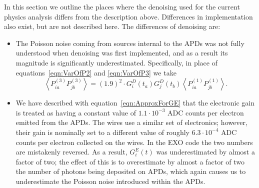 In this section we outline the places where the denoising used for the current physics analysis differs from the description above.  Differences in implementation also exist, but are not described here.  The differences of denoising are:
\begin{itemize}
\item The Poisson noise coming from sources internal to the APDs was not fully understood when denoising was first implemented, and as a result its magnitude is significantly underestimated.  Specifically, in place of equations~\ref{eqn:VarOfP2} and \ref{eqn:VarOfP3} we take
\begin{equation}
\left< P^{(3)}_{ia} P^{(3)}_{jb} \right> = (1.9)^2 \cdot G^D_i(t_a)G^D_j(t_b) \left< P^{(1)}_{ia} P^{(1)}_{jb} \right>.
\end{equation}
\item We have described with equation~\ref{eqn:ApproxForGE} that the electronic gain is treated as having a constant value of $1.1 \cdot 10^{-3}$ ADC counts per electron emitted from the APDs.  The wires use a similar set of electronics; however, their gain is nominally set to a different value of roughly $6.3 \cdot 10^{-4}$ ADC counts per electron collected on the wires. In the EXO code the two numbers are mistakenly reversed.  As a result, $G^E_i(t)$ was underestimated by almost a factor of two; the effect of this is to overestimate by almost a factor of two the number of photons being deposited on APDs, which again causes us to underestimate the Poisson noise introduced within the APDs.
\end{itemize}

